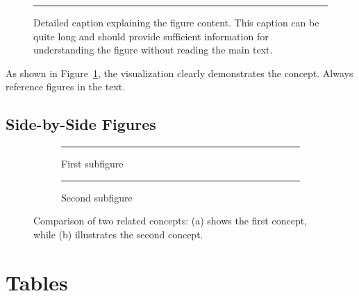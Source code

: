 \begin{figure}[htbp]
	\centering
	\rule{0.6\textwidth}{0.4\textwidth} %
	\caption[Short caption for list of figures]{Detailed caption explaining the
		figure content. This caption can be quite long and should provide
		sufficient information for understanding the figure without reading
		the main text.}
	\label{fig:single_example}
\end{figure}

As shown in Figure~\ref{fig:single_example}, the visualization clearly
demonstrates the concept. Always reference figures in the text.

\subsection*{Side-by-Side Figures}
\label{subsec:multiple_figures}

\begin{figure}[htbp]
	\centering
	\begin{subfigure}[b]{0.45\textwidth}
		\centering
		\rule{\textwidth}{0.6\textwidth} %
		\caption{First subfigure}
		\label{fig:sub1}
	\end{subfigure}
	\hfill
	\begin{subfigure}[b]{0.45\textwidth}
		\centering
		\rule{\textwidth}{0.6\textwidth} %
		\caption{Second subfigure}
		\label{fig:sub2}
	\end{subfigure}
	\caption{Comparison of two related concepts: (a) shows the first concept,
		while (b) illustrates the second concept.}
	\label{fig:comparison}
\end{figure}

\section{Tables}
\label{sec:tables}

